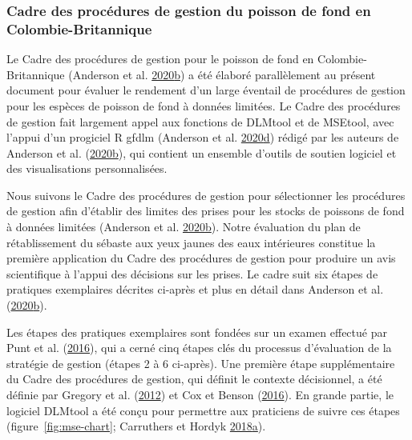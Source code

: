 \documentclass[french,11pt]{book}
\begin{document}
\hypertarget{sec:introduction-mp-framework}{%
\subsubsection{Cadre des procédures de gestion du poisson de fond en Colombie-Britannique}\label{sec:introduction-mp-framework}}

Le Cadre des procédures de gestion pour le poisson de fond en Colombie-Britannique (Anderson et al. \protect\hyperlink{ref-anderson2020gfmp}{2020}\protect\hyperlink{ref-anderson2020gfmp}{b}) a été élaboré parallèlement au présent document pour évaluer le rendement d'un large éventail de procédures de gestion pour les espèces de poisson de fond à données limitées. Le Cadre des procédures de gestion fait largement appel aux fonctions de DLMtool et de MSEtool, avec l'appui d'un progiciel R gfdlm (Anderson et al. \protect\hyperlink{ref-gfdlm}{2020}\protect\hyperlink{ref-gfdlm}{d}) rédigé par les auteurs de Anderson et al. (\protect\hyperlink{ref-anderson2020gfmp}{2020}\protect\hyperlink{ref-anderson2020gfmp}{b}), qui contient un ensemble d'outils de soutien logiciel et des visualisations personnalisées.

Nous suivons le Cadre des procédures de gestion pour sélectionner les procédures de gestion afin d'établir des limites des prises pour les stocks de poissons de fond à données limitées (Anderson et al. \protect\hyperlink{ref-anderson2020gfmp}{2020}\protect\hyperlink{ref-anderson2020gfmp}{b}). Notre évaluation du plan de rétablissement du sébaste aux yeux jaunes des eaux intérieures constitue la première application du Cadre des procédures de gestion pour produire un avis scientifique à l'appui des décisions sur les prises. Le cadre suit six étapes de pratiques exemplaires décrites ci-après et plus en détail dans Anderson et al. (\protect\hyperlink{ref-anderson2020gfmp}{2020}\protect\hyperlink{ref-anderson2020gfmp}{b}).

Les étapes des pratiques exemplaires sont fondées sur un examen effectué par Punt et al. (\protect\hyperlink{ref-punt2016}{2016}), qui a cerné cinq étapes clés du processus d'évaluation de la stratégie de gestion (étapes 2 à 6 ci-après). Une première étape supplémentaire du Cadre des procédures de gestion, qui définit le contexte décisionnel, a été définie par Gregory et al. (\protect\hyperlink{ref-gregory2012}{2012}) et Cox et Benson (\protect\hyperlink{ref-cox2016}{2016}). En grande partie, le logiciel DLMtool a été conçu pour permettre aux praticiens de suivre ces étapes (figure~\ref{fig:mse-chart}; Carruthers et Hordyk \protect\hyperlink{ref-carruthers2018}{2018}\protect\hyperlink{ref-carruthers2018}{a}).
\end{document}
